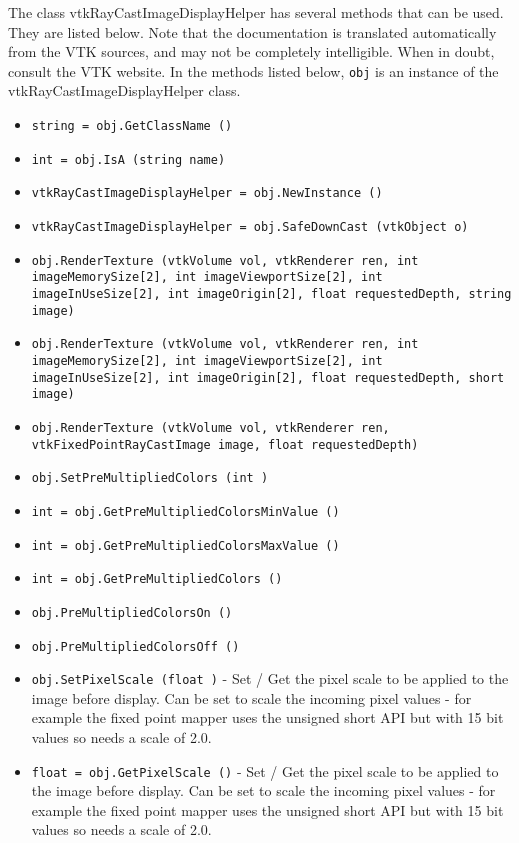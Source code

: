 The class vtkRayCastImageDisplayHelper has several methods that can be used.
  They are listed below.
Note that the documentation is translated automatically from the VTK sources,
and may not be completely intelligible.  When in doubt, consult the VTK website.
In the methods listed below, \verb|obj| is an instance of the vtkRayCastImageDisplayHelper class.
\begin{itemize}
\item  \verb|string = obj.GetClassName ()|

\item  \verb|int = obj.IsA (string name)|

\item  \verb|vtkRayCastImageDisplayHelper = obj.NewInstance ()|

\item  \verb|vtkRayCastImageDisplayHelper = obj.SafeDownCast (vtkObject o)|

\item  \verb|obj.RenderTexture (vtkVolume vol, vtkRenderer ren, int imageMemorySize[2], int imageViewportSize[2], int imageInUseSize[2], int imageOrigin[2], float requestedDepth, string image)|

\item  \verb|obj.RenderTexture (vtkVolume vol, vtkRenderer ren, int imageMemorySize[2], int imageViewportSize[2], int imageInUseSize[2], int imageOrigin[2], float requestedDepth, short image)|

\item  \verb|obj.RenderTexture (vtkVolume vol, vtkRenderer ren, vtkFixedPointRayCastImage image, float requestedDepth)|

\item  \verb|obj.SetPreMultipliedColors (int )|

\item  \verb|int = obj.GetPreMultipliedColorsMinValue ()|

\item  \verb|int = obj.GetPreMultipliedColorsMaxValue ()|

\item  \verb|int = obj.GetPreMultipliedColors ()|

\item  \verb|obj.PreMultipliedColorsOn ()|

\item  \verb|obj.PreMultipliedColorsOff ()|

\item  \verb|obj.SetPixelScale (float )| -  Set / Get the pixel scale to be applied to the image before display.
 Can be set to scale the incoming pixel values - for example the
 fixed point mapper uses the unsigned short API but with 15 bit
 values so needs a scale of 2.0.

\item  \verb|float = obj.GetPixelScale ()| -  Set / Get the pixel scale to be applied to the image before display.
 Can be set to scale the incoming pixel values - for example the
 fixed point mapper uses the unsigned short API but with 15 bit
 values so needs a scale of 2.0.

\end{itemize}
